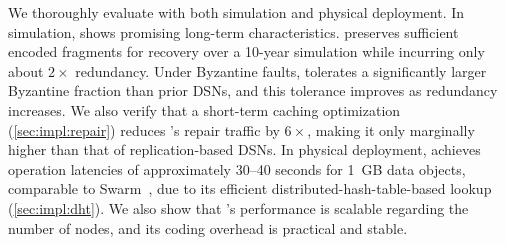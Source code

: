 We thoroughly evaluate \sys with both simulation and physical deployment.
In simulation, \sys shows promising long-term characteristics.
\sys preserves sufficient encoded fragments for recovery over a 10-year simulation while incurring only about $2\times$ redundancy.
Under Byzantine faults, \sys tolerates a significantly larger Byzantine fraction than prior DSNs, and this tolerance improves as redundancy increases.
We also verify that a short-term caching optimization (\cref{sec:impl:repair}) reduces \sys's repair traffic by $6\times$, making it only marginally higher than that of replication-based DSNs.
In physical deployment, \sys achieves operation latencies of approximately 30--40 seconds for 1~GB data objects, comparable to Swarm~\cite{swarm}, due to its efficient distributed-hash-table-based lookup (\cref{sec:impl:dht}).
We also show that \sys's performance is scalable regarding the number of nodes, and its coding overhead is practical and stable.
